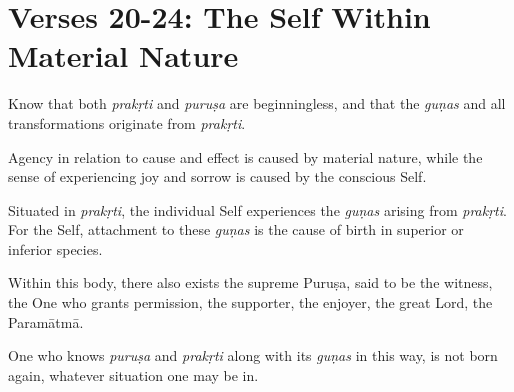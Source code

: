 \section{Verses 20-24: The Self Within Material Nature}\label{sec-verses-20-24-the-self-within-material-nature}

{Know that both \textit{prakṛti} and \textit{puruṣa} are beginningless, and that the \textit{guṇas} and all transformations originate from \textit{prakṛti}.}

{Agency in relation to cause and effect is caused by material nature, while the sense of experiencing joy and sorrow is caused by the conscious Self.}

{Situated in \textit{prakṛti}, the individual Self experiences the \textit{guṇas} arising from \textit{prakṛti}. For the Self, attachment to these \textit{guṇas} is the cause of birth in superior or inferior species.}

{Within this body, there also exists the supreme Puruṣa, said to be the witness, the One who grants permission, the supporter, the enjoyer, the great Lord, the Paramātmā.}

{One who knows \textit{puruṣa} and \textit{prakṛti} along with its \textit{guṇas} in this way, is not born again, whatever situation one may be in.}

